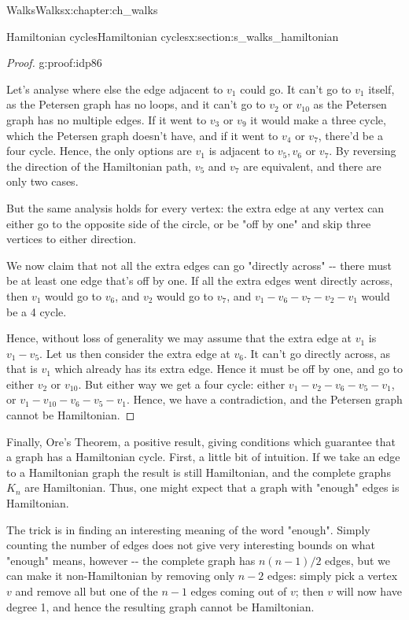 \documentclass[oneside,10pt,]{book}
\numberwithin{equation}{section}
\begin{document}
\begin{chapterptx}{Walks}{}{Walks}{}{}{x:chapter:ch_walks}
\begin{sectionptx}{Hamiltonian cycles}{}{Hamiltonian cycles}{}{}{x:section:s_walks_hamiltonian}
\begin{proof}{}{g:proof:idp86}
\par
Let's analyse where else the edge adjacent to \(v_1\) could go.  It can't go to \(v_1\) itself, as the Petersen graph has no loops, and it can't go to \(v_2\) or \(v_{10}\) as the Petersen graph has no multiple edges.  If it went to \(v_3\) or \(v_9\) it would make a three cycle, which the Petersen graph doesn't have, and if it went to \(v_4\) or \(v_7\), there'd be a four cycle.  Hence, the only options are \(v_1\) is adjacent to \(v_5, v_6\) or \(v_7\).  By reversing the direction of the Hamiltonian path, \(v_5\) and \(v_7\) are equivalent, and there are only two cases.%
\par
But the same analysis holds for every vertex: the extra edge at any vertex can either go to the opposite side of the circle, or be "off by one" and skip three vertices to either direction.%
\par
We now claim that not all the extra edges can go "directly across" -{}-{} there must be at least one edge that's off by one.  If all the extra edges went directly across, then \(v_1\) would go to \(v_6\), and \(v_2\) would go to \(v_7\), and \(v_1-v_6-v_7-v_2-v_1\) would be a 4 cycle.%
\par
Hence, without loss of generality we may assume that the extra edge at \(v_1\) is \(v_1-v_5\).  Let us then consider the extra edge at \(v_6\).  It can't go directly across, as that is \(v_1\) which already has its extra edge.  Hence it must be off by one, and go to either \(v_2\) or \(v_{10}\).  But either way we get a four cycle: either \(v_1-v_2-v_6-v_5-v_1\), or \(v_1-v_{10}-v_6-v_5-v_1\).  Hence, we have a contradiction, and the Petersen graph cannot be Hamiltonian.%
\end{proof}
Finally, Ore's Theorem, a positive result, giving conditions which guarantee that a graph has a Hamiltonian cycle.  First, a little bit of intuition.  If we take an edge to a Hamiltonian graph the result is still Hamiltonian, and the complete graphs \(K_n\) are Hamiltonian.  Thus, one might expect that a graph with "enough" edges is Hamiltonian.%
\par
The trick is in finding an interesting meaning of the word "enough".  Simply counting the number of edges does not give very interesting bounds on what "enough" means, however -{}-{} the complete graph has \(n(n-1)/2\) edges, but we can make it non-Hamiltonian by removing only \(n-2\) edges: simply pick a vertex \(v\) and remove all but one of the \(n-1\) edges coming out of \(v\); then \(v\) will now have degree 1, and hence the resulting graph cannot be Hamiltonian.%

\end{sectionptx}
\end{chapterptx}
\end{document}
